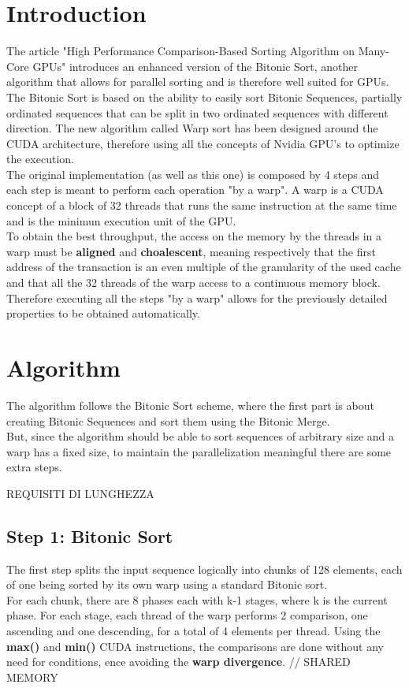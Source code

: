 \documentclass[a4paper, 12pt, oneside]{article}
\begin{document}
\section{Introduction}
The article "High Performance Comparison-Based Sorting Algorithm on Many-Core GPUs" introduces an enhanced version of the Bitonic Sort, another algorithm that allows for parallel sorting and is therefore well suited for GPUs.\\
The Bitonic Sort is based on the ability to easily sort Bitonic Sequences, partially ordinated sequences that can be split in two ordinated sequences with different direction.
The new algorithm called Warp sort has been designed around the CUDA architecture, therefore using all the concepts of Nvidia GPU's to optimize the execution.\\
The original implementation (as well as this one) is composed by 4 steps and each step is meant to perform each operation "by a warp".
A warp is a CUDA concept of a block of 32 threads that runs the same instruction at the same time and is the minimun execution unit of the GPU.\\
To obtain the best throughput, the access on the memory by the threads in a warp must be \textbf{aligned} and \textbf{choalescent}, meaning respectively that the first address of the transaction is an even multiple of the granularity of the used cache and that all the 32 threads of the warp access to a continuous memory block.\\
Therefore executing all the steps "by a warp" allows for the previously detailed properties to be obtained automatically.

\section{Algorithm}

The algorithm follows the Bitonic Sort scheme, where the first part is about creating Bitonic Sequences and sort them using the Bitonic Merge.\\
But, since the algorithm should be able to sort sequences of arbitrary size and a warp has a fixed size, to maintain the parallelization meaningful there are some extra steps.

REQUISITI DI LUNGHEZZA
\subsection{Step 1: Bitonic Sort}
The first step splits the input sequence logically into chunks of 128 elements, each of one being sorted by its own warp using a standard Bitonic sort.\\
For each chunk, there are 8 phases each with k-1 stages, where k is the current phase. For each stage, each thread of the warp performs 2 comparison, one ascending and one descending, for a total of 4 elements per thread.
Using the \textbf{max()} and \textbf{min()} CUDA instructions, the comparisons are done without any need for conditions, ence avoiding the \textbf{warp divergence}.
// SHARED MEMORY
\end{document}
